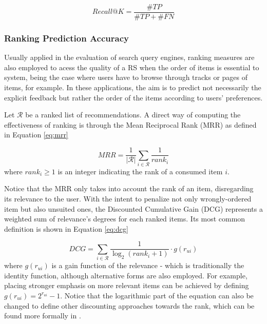 \begin{equation}
\label{eq:recall}
Recall@K = \frac{\#TP}{\#TP + \#FN}
\end{equation}

\subsubsection{Ranking Prediction Accuracy}

Usually applied in the evaluation of search query engines, ranking measures are also employed to acess the quality of a RS when the order of items is essential to system, being the case where users have to browse through tracks or pages of items, for example. In these applications, the aim is to predict not necessarily the explicit feedback but rather the order of the items according to users' preferences. 

Let $\mathcal{R}$ be a ranked list of recommendations. A direct way of computing the effectiveness of ranking is through the Mean Reciprocal Rank (MRR)  as defined in Equation \ref{eq:mrr}

\begin{equation}
\label{eq:mrr}
MRR = \frac{1}{|\mathcal{R}|}\sum_{i \in \mathcal{R}} \frac{1}{rank_i}
\end{equation} where $rank_i \geq 1$ is an integer indicating the rank of a consumed item $i$. 

Notice that the MRR only takes into account the rank of an item, disregarding its relevance to the user. With the intent to penalize not only wrongly-ordered item but also unsuited ones, the Discounted Cumulative Gain (DCG)  \cite{10.1145/582415.582418} represents a weighted sum of relevance's degrees for each ranked items. Its most common definition is shown in Equation \ref{eq:dcg}

\begin{equation}
    \label{eq:dcg}
    DCG = \sum_{i \in \mathcal{R}} \frac{1}{\log_2(rank_i+1)} \cdot g(r_{ui})
\end{equation} where $g(r_{ui})$ is a gain function of the relevance - which is traditionally the identity function, although alternative forms are also employed. For example, placing stronger emphasis on more relevant items can be achieved by defining $g(r_{ui}) = 2^{r_{ui}}-1$. Notice that the logarithmic part of the equation can also be changed to define other discounting approaches towards the rank, which can be found more formally in \cite{NDCGref}.

